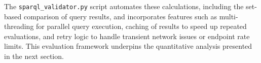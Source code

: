 The \texttt{sparql\_validator.py} script automates these calculations, including the set-based comparison of query results, and incorporates features such as multi-threading for parallel query execution, caching of results to speed up repeated evaluations, and retry logic to handle transient network issues or endpoint rate limits. 
This evaluation framework underpins the quantitative analysis presented in the next section.
